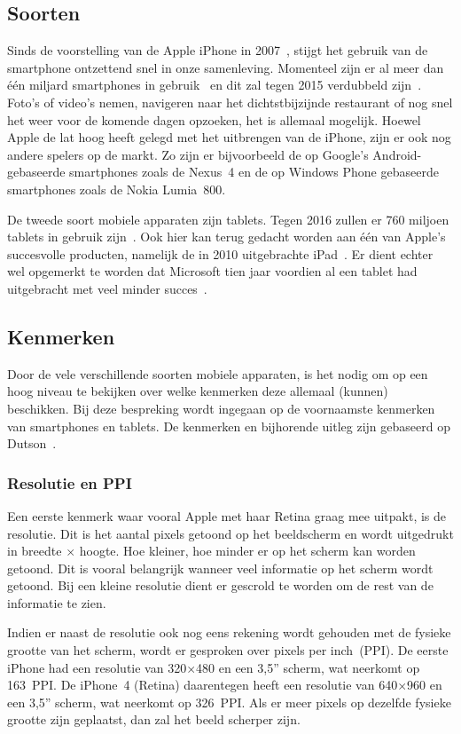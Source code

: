 \subsection{Soorten}
Sinds de voorstelling van de Apple iPhone in 2007~\cite{David2011}, stijgt het gebruik van de smartphone ontzettend snel in onze samenleving.  
Momenteel zijn er al meer dan één miljard smartphones in gebruik~\cite{Yang2012} en dit zal tegen 2015 verdubbeld zijn~\cite{Gillett2012}.
Foto's of video's nemen, navigeren naar het dichtstbijzijnde restaurant of nog snel het weer voor de komende dagen opzoeken, het is allemaal mogelijk. 
Hoewel Apple de lat hoog heeft gelegd met het uitbrengen van de iPhone, zijn er ook nog andere spelers op de markt. 
Zo zijn er bijvoorbeeld de op Google's Android-gebaseerde smartphones zoals de Nexus~4 en de op Windows Phone gebaseerde smartphones zoals de Nokia Lumia~800.

De tweede soort mobiele apparaten zijn tablets.
Tegen 2016 zullen er 760 miljoen tablets in gebruik zijn~\cite{Gillett2012}.
Ook hier kan terug gedacht worden aan één van Apple's succesvolle producten, namelijk de in 2010 uitgebrachte iPad~\cite{Apple2010}. 
Er dient echter wel opgemerkt te worden dat Microsoft tien jaar voordien al een tablet had uitgebracht met veel minder succes~\cite{Microsoft2000}.

\subsection{Kenmerken}
Door de vele verschillende soorten mobiele apparaten, is het nodig om op een hoog niveau te bekijken over welke kenmerken deze allemaal (kunnen) beschikken. 
Bij deze bespreking wordt ingegaan op de voornaamste kenmerken van smartphones en tablets. 
De kenmerken en bijhorende uitleg zijn gebaseerd op Dutson~\cite{PhilDutson2012}.

\subsubsection{Resolutie en PPI}
Een eerste kenmerk waar vooral Apple met haar Retina graag mee uitpakt, is de resolutie. 
Dit is het aantal pixels getoond op het beeldscherm en wordt uitgedrukt in breedte $\times$ hoogte. 
Hoe kleiner, hoe minder er op het scherm kan worden getoond. 
Dit is vooral belangrijk wanneer veel informatie op het scherm wordt getoond. 
Bij een kleine resolutie dient er gescrold te worden om de rest van de informatie te zien.

Indien er naast de resolutie ook nog eens rekening wordt gehouden met de fysieke grootte van het scherm, wordt er gesproken over pixels per inch~(PPI). 
De eerste iPhone had een resolutie van 320$\times$480 en een 3,5” scherm, wat neerkomt op 163~PPI. 
De iPhone~4 (Retina) daarentegen heeft een resolutie van 640$\times$960 en een 3,5” scherm, wat neerkomt op 326~PPI. 
Als er meer pixels op dezelfde fysieke grootte zijn geplaatst, dan zal het beeld scherper zijn. 

